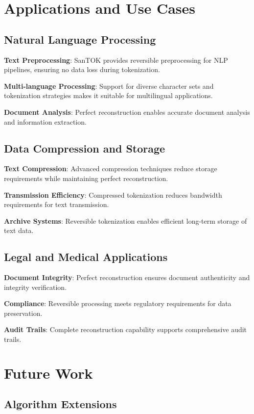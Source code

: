 \documentclass[conference]{IEEEtran}
\begin{document}
\section{Applications and Use Cases}

\subsection{Natural Language Processing}

\textbf{Text Preprocessing}: SanTOK provides reversible preprocessing for NLP pipelines, ensuring no data loss during tokenization.

\textbf{Multi-language Processing}: Support for diverse character sets and tokenization strategies makes it suitable for multilingual applications.

\textbf{Document Analysis}: Perfect reconstruction enables accurate document analysis and information extraction.

\subsection{Data Compression and Storage}

\textbf{Text Compression}: Advanced compression techniques reduce storage requirements while maintaining perfect reconstruction.

\textbf{Transmission Efficiency}: Compressed tokenization reduces bandwidth requirements for text transmission.

\textbf{Archive Systems}: Reversible tokenization enables efficient long-term storage of text data.

\subsection{Legal and Medical Applications}

\textbf{Document Integrity}: Perfect reconstruction ensures document authenticity and integrity verification.

\textbf{Compliance}: Reversible processing meets regulatory requirements for data preservation.

\textbf{Audit Trails}: Complete reconstruction capability supports comprehensive audit trails.

\section{Future Work}

\subsection{Algorithm Extensions}
\end{document}
